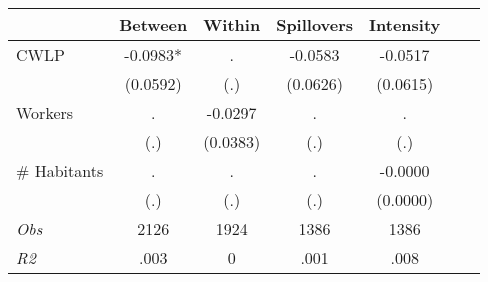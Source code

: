 \begin{tabular}{l*{6}{c}}\hline&\multicolumn{1}{c}{Between}&\multicolumn{1}{c}{Within}&\multicolumn{1}{c}{Spillovers}&\multicolumn{1}{c}{Intensity}\\ \hline 
CWLP & -0.0983* & . & -0.0583 & -0.0517 \\
 & (0.0592) & (.) & (0.0626) & (0.0615) \\
Workers & . & -0.0297 & . & . \\
 & (.) & (0.0383) & (.) & (.) \\
\# Habitants & . & . & . & -0.0000 \\
  & (.) & (.) & (.) & (0.0000) \\
\hline \textit{Obs} & 2126 & 1924 & 1386 & 1386  \\ \textit{R2} & .003 & 0 & .001 & .008 \\ \hline \end{tabular}

